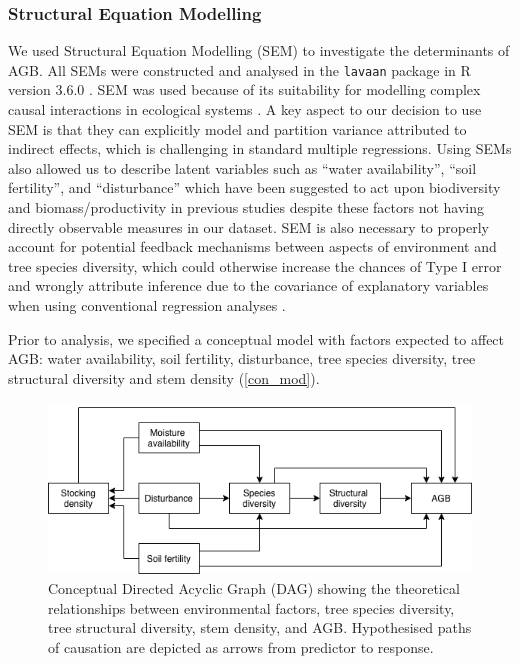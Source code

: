 \documentclass[11pt,a4paper]{article}
\begin{document}
\subsubsection{Structural Equation Modelling}

We used Structural Equation Modelling (SEM) to investigate the determinants of AGB. All SEMs were constructed and analysed in the \verb|lavaan| package \citep{lavaan} in R version 3.6.0 \citep{R2019}. SEM was used because of its suitability for modelling complex causal interactions in ecological systems \citep{Lee2007}. A key aspect to our decision to use SEM is that they can explicitly model and partition variance attributed to indirect effects, which is challenging in standard multiple regressions. Using SEMs also allowed us to describe latent variables such as ``water availability'', ``soil fertility'', and ``disturbance'' which have been suggested to act upon biodiversity and biomass/productivity in previous studies despite these factors not having directly observable measures in our dataset. SEM is also necessary to properly account for potential feedback mechanisms between aspects of environment and tree species diversity, which could otherwise increase the chances of Type I error and wrongly attribute inference due to the covariance of explanatory variables when using conventional regression analyses \citep{Nachtigall2003}.

Prior to analysis, we specified a conceptual model with factors expected to affect AGB: water availability, soil fertility, disturbance, tree species diversity, tree structural diversity and stem density (\autoref{con_mod}). 

\begin{figure}[H]
\centering
\includegraphics[width=\textwidth]{concept}
	\caption{Conceptual Directed Acyclic Graph (DAG) showing the theoretical relationships between environmental factors, tree species diversity, tree structural diversity, stem density, and AGB. Hypothesised paths of causation are depicted as arrows from predictor to response.}
	\label{con_mod}
\end{figure}
\end{document}
